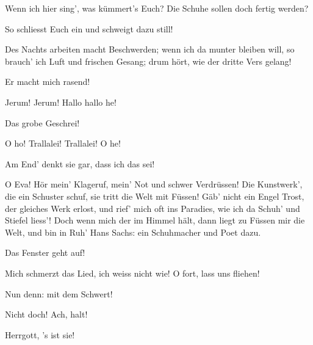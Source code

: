 \begin{drama}
\Sachsspeaks
Wenn ich hier sing', was kümmert's Euch?
Die Schuhe sollen doch fertig werden?

\Beckmesserspeaks
So schliesst Euch ein und schweigt dazu still!

\Sachsspeaks
Des Nachts arbeiten macht Beschwerden;
wenn ich da munter bleiben will,
so brauch' ich Luft und frischen Gesang;
drum hört, wie der dritte Vers gelang!



\Beckmesserspeaks
Er macht mich rasend!

\Sachsspeaks


Jerum! Jerum!
Hallo hallo he!

\Beckmesserspeaks
Das grobe Geschrei!

\Sachsspeaks
O ho! Trallalei! Trallalei! O he!

\Beckmesserspeaks
Am End' denkt sie gar, dass ich das sei!



\Sachsspeaks
O Eva! Hör mein' Klageruf,
mein' Not und schwer Verdrüssen!
Die Kunstwerk', die ein Schuster schuf,
sie tritt die Welt mit Füssen!
Gäb' nicht ein Engel Trost,
der gleiches Werk erlost,
und rief' mich oft ins Paradies,
wie ich da Schuh' und Stiefel liess'!
Doch wenn mich der im Himmel hält,
dann liegt zu Füssen mir die Welt,
und bin in Ruh'
Hans Sachs: ein Schuhmacher und Poet dazu.

\Beckmesserspeaks
Das Fenster geht auf!



\Evaspeaks


Mich schmerzt das Lied, ich weiss nicht wie!
O fort, lass uns fliehen!

\Waltherspeaks


Nun denn:
mit dem Schwert!

\Evaspeaks
Nicht doch! Ach, halt!

\Beckmesserspeaks
Herrgott, 's ist sie!

\Waltherspeaks



\end{drama}
